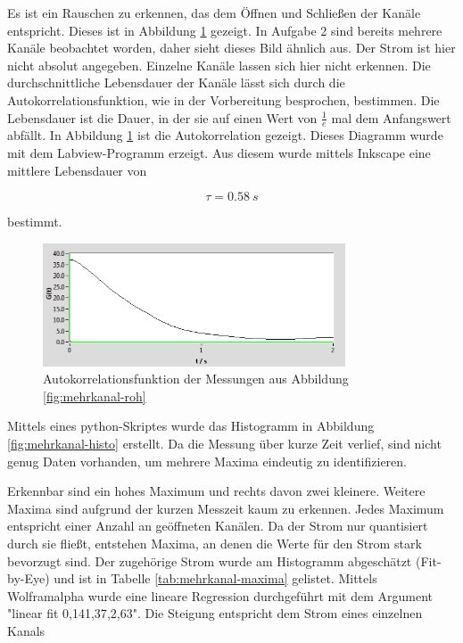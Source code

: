 \documentclass[a4paper,ngerman]{scrartcl}
\begin{document}
Es ist ein Rauschen zu erkennen, das dem Öffnen und Schließen der Kanäle entspricht. Dieses ist in Abbildung \ref{fig:mehrkanal-korrel} gezeigt. In Aufgabe 2 sind bereits mehrere Kanäle beobachtet worden, daher sieht dieses Bild ähnlich aus. Der Strom ist hier nicht absolut angegeben. Einzelne Kanäle lassen sich hier nicht erkennen. Die durchschnittliche Lebensdauer der Kanäle lässt sich durch die Autokorrelationsfunktion, wie in der Vorbereitung besprochen, bestimmen. Die Lebensdauer ist die Dauer, in der sie auf einen Wert von $\frac{1}{e}$ mal dem Anfangswert abfällt. In Abbildung \ref{fig:mehrkanal-korrel} ist die Autokorrelation gezeigt. Dieses Diagramm wurde mit dem Labview-Programm erzeigt. Aus diesem wurde mittels Inkscape eine mittlere Lebensdauer von

\begin{equation}
\tau = \SI{0.58}{s}
\end{equation}

bestimmt.

\begin{figure}[tbh!]
\includegraphics[width=0.8\textwidth]{abbildungen/mehrkanal_korrel.png}
\caption{Autokorrelationsfunktion der Messungen aus Abbildung \ref{fig:mehrkanal-roh}}
\label{fig:mehrkanal-korrel}
\end{figure}

Mittels eines python-Skriptes wurde das Histogramm in Abbildung \ref{fig:mehrkanal-histo} erstellt. Da die Messung über kurze Zeit verlief, sind nicht genug Daten vorhanden, um mehrere Maxima eindeutig zu identifizieren. 

Erkennbar sind ein hohes Maximum und rechts davon zwei kleinere. Weitere Maxima sind aufgrund der kurzen Messzeit kaum zu erkennen.
Jedes Maximum entspricht einer Anzahl an geöffneten Kanälen. Da der Strom nur quantisiert durch sie fließt, entstehen Maxima, an denen die Werte für den Strom stark bevorzugt sind.
Der zugehörige Strom wurde am Histogramm abgeschätzt (Fit-by-Eye) und ist in Tabelle \ref{tab:mehrkanal-maxima} gelistet. Mittels Wolframalpha wurde eine lineare Regression durchgeführt mit dem Argument "linear fit {0,14}{1,37},{2,63}". Die Steigung entspricht dem Strom eines einzelnen Kanals
\end{document}
